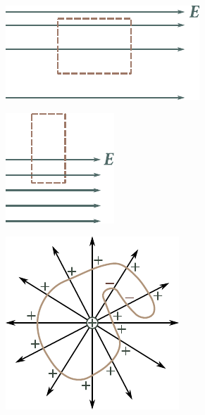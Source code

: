 \begin{figure}[t]
	\begin{minipage}[t]{0.36\linewidth}
		\begin{center}
			\includegraphics[scale=0.93]{figures/ch_01/fig_1_34.pdf}
			\caption[]{}
			\label{fig:1_34}
		\end{center}
	\end{minipage}
	\hfill{ }
	\begin{minipage}[t]{0.2\linewidth}
		\begin{center}
			\includegraphics[scale=0.93]{figures/ch_01/fig_1_35.pdf}
			\caption[]{}
			\label{fig:1_35}
		\end{center}
	\end{minipage}
	\hfill{ }
	\begin{minipage}[t]{0.37\linewidth}
		\begin{center}
			\includegraphics[scale=0.95]{figures/ch_01/fig_1_36.pdf}
			\caption[]{}
			\label{fig:1_36}
		\end{center}
	\end{minipage}
\vspace{-0.5cm}
\end{figure}

